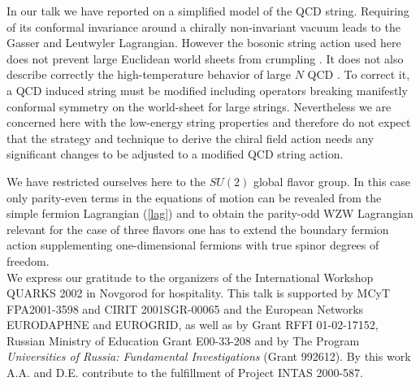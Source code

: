 \documentclass[a4paper,12pt]{article}
\begin{document}
In our talk we have reported on a simplified model of the QCD string.
Requiring of its conformal invariance 
around a chirally non-invariant vacuum leads to the Gasser and
Leutwyler
Lagrangian. However the  bosonic string
action used here does not prevent large Euclidean 
world sheets from crumpling \cite{pol1}. It does not also describe correctly
the high-temperature behavior of large $N$ QCD \cite{polch2}. To correct it,
a QCD induced string must be modified \cite{pol1,diam}  including 
operators breaking manifestly conformal symmetry
on the world-sheet for large strings. Nevertheless we are concerned here
with the low-energy string properties and therefore do not expect that the strategy
and technique to derive the chiral field action needs any significant
changes to be adjusted to a modified QCD string action. 

We have restricted ourselves here to the $SU(2)$ 
global flavor
group. In this case only parity-even terms in the equations 
of motion can be
revealed from the simple fermion Lagrangian (\ref{lag}) and to obtain the parity-odd
WZW Lagrangian relevant for the case of three flavors one has to extend the
boundary fermion action supplementing one-dimensional fermions 
with true spinor degrees of freedom.\\

We express our gratitude to the organizers of the
International Workshop QUARKS 2002 in Novgorod for
hospitality.
This talk is supported by
MCyT FPA2001-3598 and CIRIT 2001SGR-00065 and the European
Networks EURODAPHNE and EUROGRID, as well as by Grant RFFI
01-02-17152, Russian
Ministry of Education Grant E00-33-208 and by The Program {\sl Universities
of Russia: Fundamental Investigations} (Grant 992612). By this work A.A. and 
D.E. contribute 
to the fulfillment of  Project INTAS 2000-587.
\end{document}
